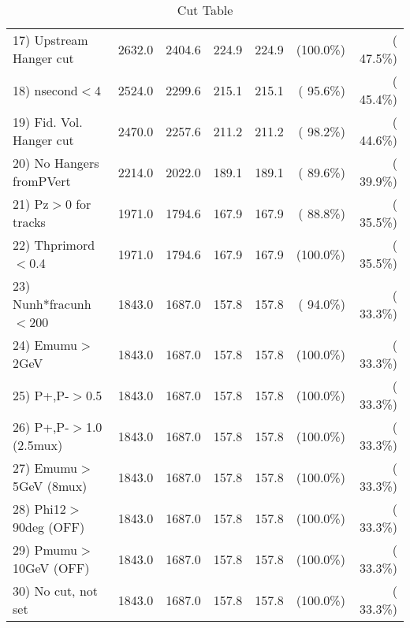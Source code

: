 \begin{table}[h!]
\begin{tabular}{||l||r|r|r|r|r|r||}
 17) Upstream Hanger cut  &       2632.0 &       2404.6 &        224.9 &        224.9 & (100.0\%) & ( 47.5\%) \\
 18) nsecond$<$4          &       2524.0 &       2299.6 &        215.1 &        215.1 & ( 95.6\%) & ( 45.4\%) \\
 19) Fid. Vol. Hanger cut &       2470.0 &       2257.6 &        211.2 &        211.2 & ( 98.2\%) & ( 44.6\%) \\
 20) No Hangers fromPVert &       2214.0 &       2022.0 &        189.1 &        189.1 & ( 89.6\%) & ( 39.9\%) \\
 21) Pz$>$0 for tracks    &       1971.0 &       1794.6 &        167.9 &        167.9 & ( 88.8\%) & ( 35.5\%) \\
 22) Thprimord$<$0.4      &       1971.0 &       1794.6 &        167.9 &        167.9 & (100.0\%) & ( 35.5\%) \\
 23) Nunh*fracunh$<$200   &       1843.0 &       1687.0 &        157.8 &        157.8 & ( 94.0\%) & ( 33.3\%) \\
 24) Emumu$>$2GeV         &       1843.0 &       1687.0 &        157.8 &        157.8 & (100.0\%) & ( 33.3\%) \\
 25) P+,P-$>$0.5          &       1843.0 &       1687.0 &        157.8 &        157.8 & (100.0\%) & ( 33.3\%) \\
 26) P+,P-$>$1.0 (2.5mux) &       1843.0 &       1687.0 &        157.8 &        157.8 & (100.0\%) & ( 33.3\%) \\
 27) Emumu$>$5GeV  (8mux) &       1843.0 &       1687.0 &        157.8 &        157.8 & (100.0\%) & ( 33.3\%) \\
 28) Phi12$>$90deg  (OFF) &       1843.0 &       1687.0 &        157.8 &        157.8 & (100.0\%) & ( 33.3\%) \\
 29) Pmumu$>$10GeV  (OFF) &       1843.0 &       1687.0 &        157.8 &        157.8 & (100.0\%) & ( 33.3\%) \\
 30) No cut, not set      &       1843.0 &       1687.0 &        157.8 &        157.8 & (100.0\%) & ( 33.3\%) \\
 \hline
 \hline
 \end{tabular}
 \caption{Cut Table           }
 \label{tab-cutcohjpsi-mumu_anumucc}
 \end{table}
